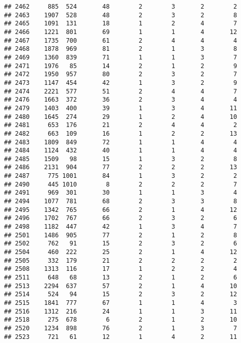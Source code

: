 \documentclass[]{article}
\begin{document}
\begin{verbatim}
## 2462     885  524       48        2        3       2        2
## 2463    1907  528       48        2        3       2        8
## 2465    1091  131       18        1        2       4        7
## 2466    1221  801       69        1        1       4       12
## 2467    1735  700       61        2        4       4        4
## 2468    1878  969       81        2        1       3        8
## 2469    1360  839       71        1        1       3        7
## 2471    1976   85       14        2        1       2        9
## 2472    1950  957       80        2        3       2        7
## 2473    1147  454       42        1        3       2        9
## 2474    2221  577       51        2        4       4        7
## 2476    1663  372       36        2        3       4        4
## 2479    1403  400       39        1        3       4       11
## 2480    1645  274       29        1        2       4       10
## 2481     653  176       21        2        4       4        2
## 2482     663  109       16        1        2       2       13
## 2483    1809  849       72        1        1       4        4
## 2484    1124  432       40        1        1       4        4
## 2485    1509   98       15        1        3       2        8
## 2486    2131  904       77        2        2       2       13
## 2487     775 1001       84        1        3       2        2
## 2490     445 1010        8        2        2       2        7
## 2491     969  301       30        1        1       3        4
## 2494    1077  781       68        2        3       3        8
## 2495    1342  765       66        2        1       4       12
## 2496    1702  767       66        2        3       2        6
## 2498    1182  447       42        1        3       4        7
## 2501    1486  905       77        2        1       2        8
## 2502     762   91       15        2        3       2        6
## 2504     460  222       25        2        1       4       12
## 2505     332  179       21        2        2       2        2
## 2508    1313  116       17        1        2       2        4
## 2511     648   68       13        2        1       2        6
## 2513    2294  637       57        2        1       4       10
## 2514     524   94       15        2        3       2       12
## 2515    1841  777       67        1        1       4        3
## 2516    1312  216       24        1        1       3       11
## 2518     275  678        6        2        1       2       10
## 2520    1234  898       76        2        1       3        7
## 2523     721   61       12        1        4       2       11

\end{verbatim}
\end{document}
